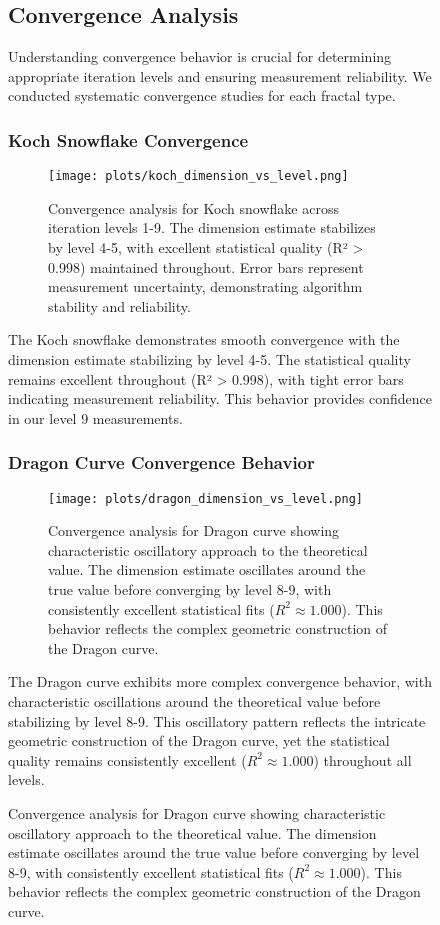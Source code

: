 \documentclass[preprint,12pt]{elsarticle}
\begin{document}
\begin{figure}[ht]
\subsection{Convergence Analysis}

Understanding convergence behavior is crucial for determining appropriate iteration levels and ensuring measurement reliability. We conducted systematic convergence studies for each fractal type.

\subsubsection{Koch Snowflake Convergence}

\begin{figure}[ht]
\centering
\texttt{[image: plots/koch\_dimension\_vs\_level.png]}
\caption{Convergence analysis for Koch snowflake across iteration levels 1-9. The dimension estimate stabilizes by level 4-5, with excellent statistical quality (R² > 0.998) maintained throughout. Error bars represent measurement uncertainty, demonstrating algorithm stability and reliability.}
\label{fig:koch_convergence}
\end{figure}

The Koch snowflake demonstrates smooth convergence with the dimension estimate stabilizing by level 4-5. The statistical quality remains excellent throughout (R² > 0.998), with tight error bars indicating measurement reliability. This behavior provides confidence in our level 9 measurements.

\subsubsection{Dragon Curve Convergence Behavior}

\begin{figure}[ht]
\centering
\texttt{[image: plots/dragon\_dimension\_vs\_level.png]}
\caption{Convergence analysis for Dragon curve showing characteristic oscillatory approach to the theoretical value. The dimension estimate oscillates around the true value before converging by level 8-9, with consistently excellent statistical fits ($R^2 \approx 1.000$). This behavior reflects the complex geometric construction of the Dragon curve.}
\label{fig:dragon_convergence}
\end{figure}

The Dragon curve exhibits more complex convergence behavior, with characteristic oscillations around the theoretical value before stabilizing by level 8-9. This oscillatory pattern reflects the intricate geometric construction of the Dragon curve, yet the statistical quality remains consistently excellent ($R^2 \approx 1.000$) throughout all levels.


\end{figure}
\end{document}
